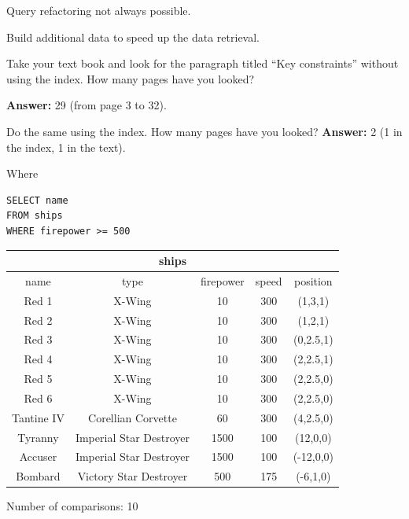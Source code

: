 \documentclass{beamer}
\begin{document}
\begin{slide}{
\item Query refactoring not always possible.
\item Build additional data to speed up the data retrieval.
}\end{slide}

\begin{slide}{
\item Take your text book and look for the paragraph titled ``Key constraints'' without using the index. How many pages have you looked?
\pause
\item \textbf{Answer:} 29 (from page 3 to 32).
\pause
\item Do the same using the index. How many pages have you looked?
\pause
\textbf{Answer:} 2 (1 in the index, 1 in the text).
}\end{slide}

\begin{frame}[fragile]{Where}
\begin{lstlisting}
SELECT name
FROM ships
WHERE firepower >= 500
\end{lstlisting}
\tiny
\begin{tabular}{|c|c|c|c|c|}
\hline
\multicolumn{5}{|c|}{\textbf{ships}} \\
\hline
name & type & firepower & speed & position \\
\hline
Red 1 & X-Wing & 10 & 300 & (1,3,1) \\
\hline
Red 2 & X-Wing & 10 & 300 & (1,2,1) \\
\hline
Red 3 & X-Wing & 10 & 300 & (0,2.5,1) \\
\hline
Red 4 & X-Wing & 10 & 300 & (2,2.5,1) \\
\hline
Red 5 & X-Wing & 10 & 300 & (2,2.5,0) \\
\hline
Red 6 & X-Wing & 10 & 300 & (2,2.5,0) \\
\hline
Tantine IV & Corellian Corvette & 60 & 300 & (4,2.5,0) \\
\hline
Tyranny & Imperial Star Destroyer & 1500 & 100 & (12,0,0) \\
\hline
Accuser & Imperial Star Destroyer & 1500 & 100& (-12,0,0)\\
\hline
Bombard & Victory Star Destroyer & 500 & 175 & (-6,1,0)\\
\hline
\end{tabular}

\pause
Number of comparisons: 10
\end{frame}
\end{document}
